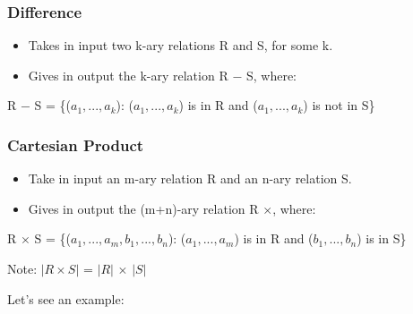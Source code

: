 \subsubsection{Difference}
\begin{itemize}
    \item Takes in input two k-ary relations R and S, for some k.
    \item Gives in output the k-ary relation R $-$ S, where:
\end{itemize}
R $-$ S = \{($a_1,...,a_k$): ($a_1,...,a_k$) is in R and ($a_1,...,a_k$) is not in S\}

\subsubsection{Cartesian Product}
\begin{itemize}
    \item Take in input an m-ary relation R and an n-ary relation S.
    \item Gives in output the (m+n)-ary relation R $\times$, where:
\end{itemize}
R $\times$ S = \{($a_1,...,a_m,b_1,...,b_n$): ($a_1,...,a_m$) is in R and ($b_1,...,b_n$) is in S\}

\vspace{1.5em}
Note:
$\left\lvert R \times S \right\rvert$ = $\left\lvert R \right\rvert$ $\times$ $\left\lvert S \right\rvert$

\vspace{1.5em}
Let's see an example:

